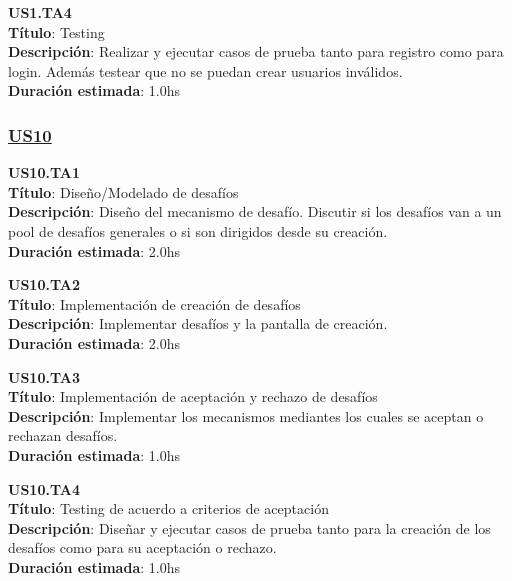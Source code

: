 \begin{tcolorbox}
\textbf{US1.TA4} \\
\textbf{Título}: Testing \\
\textbf{Descripción}: Realizar y ejecutar casos de prueba tanto para registro como para login. Además testear que no se puedan crear usuarios inválidos. \\
\textbf{Duración estimada}: 1.0hs
\end{tcolorbox}
\vspace{10pt}

\subsubsection*{\underline{US10}}

\begin{tcolorbox}
\textbf{US10.TA1} \\
\textbf{Título}: Diseño/Modelado de desafíos \\
\textbf{Descripción}: Diseño del mecanismo de desafío. Discutir si los desafíos van a un pool de desafíos generales o si son dirigidos desde su creación.\\
\textbf{Duración estimada}: 2.0hs
\end{tcolorbox}
\vspace{10pt}

\begin{tcolorbox}
\textbf{US10.TA2} \\
\textbf{Título}: Implementación de creación de desafíos \\
\textbf{Descripción}: Implementar desafíos y la pantalla de creación.\\
\textbf{Duración estimada}: 2.0hs
\end{tcolorbox}
\vspace{10pt}

\begin{tcolorbox}
\textbf{US10.TA3} \\
\textbf{Título}: Implementación de aceptación  y rechazo de desafíos \\
\textbf{Descripción}: Implementar los mecanismos mediantes los cuales se aceptan  o rechazan desafíos.\\
\textbf{Duración estimada}: 1.0hs
\end{tcolorbox}
\vspace{10pt}

\begin{tcolorbox}
\textbf{US10.TA4} \\
\textbf{Título}: Testing de acuerdo a criterios de aceptación \\
\textbf{Descripción}: Diseñar y ejecutar casos de prueba tanto para la creación de los desafíos como para su aceptación o rechazo.\\
\textbf{Duración estimada}: 1.0hs
\end{tcolorbox}
\vspace{10pt}



